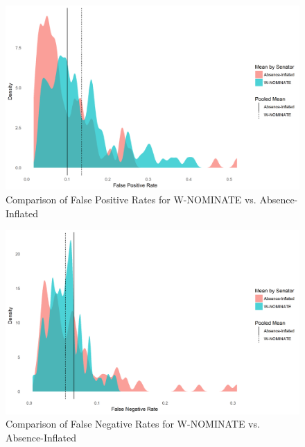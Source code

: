 \begin{figure}[h!]
	\caption{Comparison of False Positive Rates for W-NOMINATE vs. Absence-Inflated}\label{fpr_wnom}
		\includegraphics[width=0.9\linewidth]{false_positive_WN_sen}
\end{figure}
\begin{figure}[h!]
	\caption{Comparison of False Negative Rates for W-NOMINATE vs. Absence-Inflated}\label{fnr_wnom}
			\includegraphics[width=0.9\linewidth]{false_negative_WN_sen}
\end{figure}

